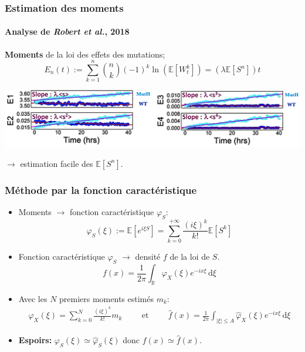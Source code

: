 \documentclass{beamer}
\newcommand{\pth}[1]{\left(#1\right)}
\newcommand{\cro}[1]{\left[#1\right]}
\newcommand{\abs}[1]{\left|#1\right|}
\newcommand{\et}{\hspace{1cm}\text{et}\hspace{1cm}}
\newcommand{\de}{\,\text{d}}
\newcommand{\Esp}[1]{\mathbb{E}\cro{#1}}
\begin{document}
\begin{frame}
  \frametitle{Estimation des moments}

  \framesubtitle{Analyse de \emph{Robert et al.}, 2018}

  
\textbf{Moments} de la loi des effets des mutations;
 \[E_n(t):=\sum_{k=1}^n\binom{n}{k}(-1)^k\ln\pth{\Esp{W_t^k}}=\pth{\lambda\Esp{S^n}}t\]
 \pause
    \vspace{0.7cm}
 \begin{centering}
 
    \includegraphics[scale=0.55]{img/Moments_estimation.png}
 \end{centering}
    \vspace{0.7cm}
 
$\to$ estimation facile des $\Esp{S^n}$.
\end{frame}


\begin{frame}
  \frametitle{Méthode par la fonction caractéristique}
  
  \begin{itemize}[label=$\bullet$]
  \item Moments $\to$ fonction caractéristique $\varphi_S$: 
    \[\varphi_S(\xi):=\Esp{e^{i\xi S}}=\sum_{k=0}^{+\infty}\frac{(i\xi)^k}{k!}\Esp{S^k}\]
    \pause
  \item Fonction caractéristique $\varphi_S$ $\to$ densité $f$ de la loi de $S$.
    \[f(x) = \frac1{2\pi} \int_{\mathbb R}\varphi_X(\xi)e^{-ix\xi}\de\xi\]
    \pause
  \item Avec les $N$ premiers moments estimés $m_k$:
    \begin{align*}
      \hat{\varphi}_X(\xi)=\sum_{k=0}^{N}\frac{(i\xi)^k}{k!}m_k
      \et\hat{f}(x)= \frac1{2\pi} \int_{\abs{\xi}\leqslant A}\hat\varphi_X(\xi)e^{-ix\xi}\de\xi
    \end{align*}
    \vspace{0.3cm}
    
  \item  \textbf{Espoirs:} $\varphi_S(\xi)\simeq \hat{\varphi}_S(\xi)$ donc $f(x)\simeq\hat{f}(x)$.
  \end{itemize}
  
\end{frame}
\end{document}
